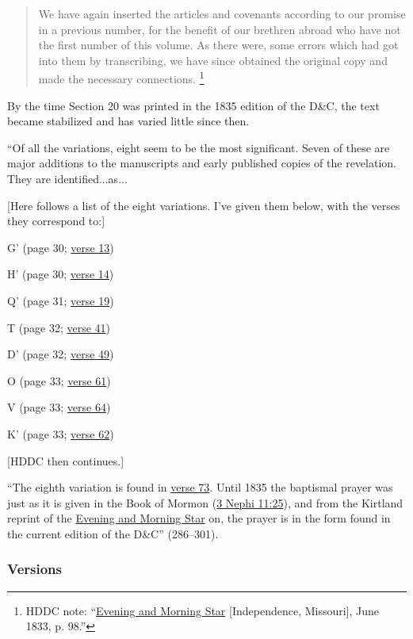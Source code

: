 				\begin{quote}
					We have again inserted the articles and covenants according to our promise in a previous number, for the benefit of our brethren abroad who have not the first number of this volume. As there were, some errors which had got into them by transcribing, we have since obtained the original copy and made the necessary connections.%
						\footnote{%
								HDDC note: ``\uline{Evening and Morning Star} [Independence, Missouri], June 1833, p. 98.''
							} 
				\end{quote}
				
			\noindent By the time Section 20 was printed in the 1835 edition of the D\&C, the text became stabilized and has varied little since then.

			``Of all the variations, eight seem to be the most significant. Seven of these are major additions to the manuscripts and early published copies of the revelation. They are identified...as...
			
			[Here follows a list of the eight variations. I've given them below, with the verses they correspond to:]
			
			\begin{compactitem}
				\item G' (page 30; \hyperref[DC20-13]{verse 13})
				\item H' (page 30; \hyperref[DC20-14]{verse 14})
				\item Q' (page 31; \hyperref[DC20-19]{verse 19})
				\item T (page 32; \hyperref[DC20-41]{verse 41})
				\item D' (page 32; \hyperref[DC20-49]{verse 49})
				\item O (page 33; \hyperref[DC20-61]{verse 61})
				\item V (page 33; \hyperref[DC20-64]{verse 64})
				\item K' (page 33; \hyperref[DC20-62]{verse 62})
			\end{compactitem}
			
			[HDDC then continues.]
			
			``The eighth variation is found in \hyperref[DC20-73]{verse 73}. Until 1835 the baptismal prayer was just as it is given in the Book of Mormon (\hyperref[3NEPHI-11-25]{3 Nephi 11:25}), and from the Kirtland reprint of the \uline{Evening and Morning Star} on, the prayer is in the form found in the current edition of the D\&C'' (286--301).
			
	\subsubsection{Versions}
		\label{DC20-V}
		
